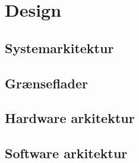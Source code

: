 \chapter{Design}

\section{Systemarkitektur} 


\section{Grænseflader}


\section{Hardware arkitektur}


\section{Software arkitektur}

